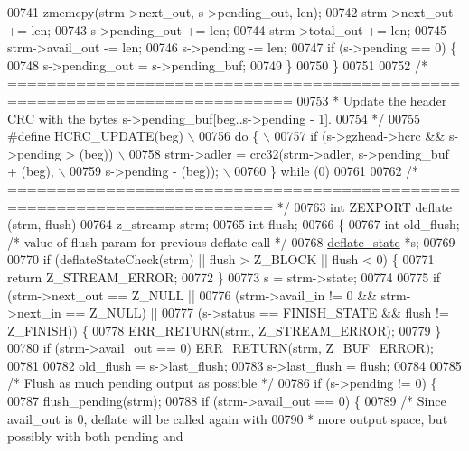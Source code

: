 \begin{DoxyCode}
{00741     zmemcpy(strm->next\_out, s->pending\_out, len);
00742     strm->next\_out  += len;
00743     s->pending\_out  += len;
00744     strm->total\_out += len;
00745     strm->avail\_out -= len;
00746     s->pending      -= len;
00747     \textcolor{keywordflow}{if} (s->pending == 0) \{
00748         s->pending\_out = s->pending\_buf;
00749     \}
00750 \}
00751 
00752 \textcolor{comment}{/* ===========================================================================}
00753 \textcolor{comment}{ * Update the header CRC with the bytes s->pending\_buf[beg..s->pending - 1].}
00754 \textcolor{comment}{ */}
00755 \textcolor{preprocessor}{#define HCRC\_UPDATE(beg) \(\backslash\)}
00756 \textcolor{preprocessor}{    do \{ \(\backslash\)}
00757 \textcolor{preprocessor}{        if (s->gzhead->hcrc && s->pending > (beg)) \(\backslash\)}
00758 \textcolor{preprocessor}{            strm->adler = crc32(strm->adler, s->pending\_buf + (beg), \(\backslash\)}
00759 \textcolor{preprocessor}{                                s->pending - (beg)); \(\backslash\)}
00760 \textcolor{preprocessor}{    \} while (0)}
00761 
00762 \textcolor{comment}{/* ========================================================================= */}
00763 \textcolor{keywordtype}{int} ZEXPORT deflate (strm, flush)
00764     z\_streamp strm;
00765     \textcolor{keywordtype}{int} flush;
00766 \{
00767     \textcolor{keywordtype}{int} old\_flush; \textcolor{comment}{/* value of flush param for previous deflate call */}
00768     \hyperlink{structinternal__state}{deflate\_state} *s;
00769 
00770     \textcolor{keywordflow}{if} (deflateStateCheck(strm) || flush > Z\_BLOCK || flush < 0) \{
00771         \textcolor{keywordflow}{return} Z\_STREAM\_ERROR;
00772     \}
00773     s = strm->state;
00774 
00775     \textcolor{keywordflow}{if} (strm->next\_out == Z\_NULL ||
00776         (strm->avail\_in != 0 && strm->next\_in == Z\_NULL) ||
00777         (s->status == FINISH\_STATE && flush != Z\_FINISH)) \{
00778         ERR\_RETURN(strm, Z\_STREAM\_ERROR);
00779     \}
00780     \textcolor{keywordflow}{if} (strm->avail\_out == 0) ERR\_RETURN(strm, Z\_BUF\_ERROR);
00781 
00782     old\_flush = s->last\_flush;
00783     s->last\_flush = flush;
00784 
00785     \textcolor{comment}{/* Flush as much pending output as possible */}
00786     \textcolor{keywordflow}{if} (s->pending != 0) \{
00787         flush\_pending(strm);
00788         \textcolor{keywordflow}{if} (strm->avail\_out == 0) \{
00789             \textcolor{comment}{/* Since avail\_out is 0, deflate will be called again with}
00790 \textcolor{comment}{             * more output space, but possibly with both pending and}
}
\end{DoxyCode}
